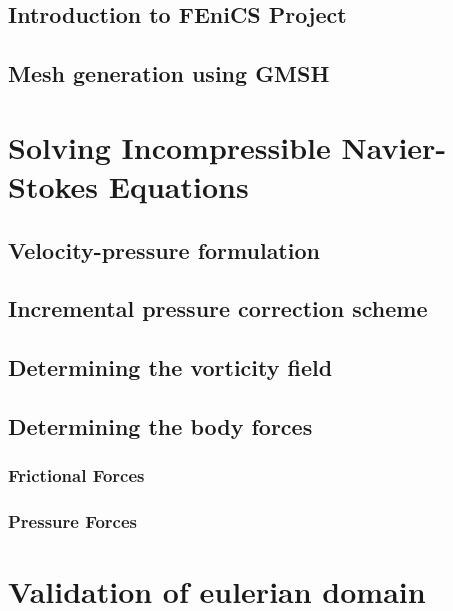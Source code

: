 \subsection{Introduction to FEniCS Project}

\subsection{Mesh generation using GMSH}


\section{Solving Incompressible Navier-Stokes Equations}

\subsection{Velocity-pressure formulation}

\subsection{Incremental pressure correction scheme}

\subsection{Determining the vorticity field}

\subsection{Determining the body forces}

\subsubsection*{Frictional Forces}

\subsubsection*{Pressure Forces}


\section{Validation of eulerian domain}

